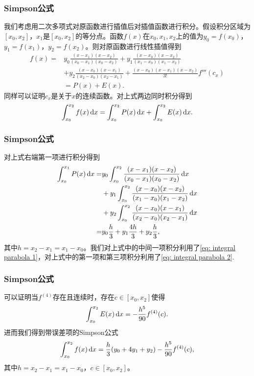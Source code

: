 \documentclass[10pt]{beamer}
\def\dx{\,{\rm d}x}
\begin{document}
\begin{frame}
\frametitle{Simpson公式}
我们考虑用二次多项式对原函数进行插值后对插值函数进行积分。假设积分区域为$[x_0, x_2]$，$x_1$是$[x_0, x_2]$的等分点。函数$f(x)$在$x_0, x_1, x_2$上的值为$y_0 = f(x_0)$，$y_1 = f(x_1)$，$y_2 = f(x_2)$。则对原函数进行线性插值得到
\begin{align*}
f(x) = &y_0 \frac{(x - x_1)(x - x_2)}{(x_0 - x_1)(x_0 - x_2)} +y_1 \frac{(x - x_0)(x - x_2)}{(x_1 - x_0)(x_1 - x_2)}  \nonumber \\
         &+ y_2 \frac{(x - x_0)(x - x_1)}{(x_2 - x_0)(x_2 - x_1)} + \frac{(x - x_0)(x - x_1)(x - x_2)}{3!}f'''(c_x)\nonumber \\
         & = P(x) + E(x). 
\end{align*}
同样可以证明$c_x$是关于$x$的连续函数。对上式两边同时积分得到
\begin{equation}
\label{eq: simpson rule original}
\int_{x_0}^{x_2} f(x) \dx = \int_{x_0}^{x_2} P(x) \dx + \int_{x_0}^{x_2} E(x) \dx.
\end{equation}
\end{frame}


\begin{frame}
\frametitle{Simpson公式}
对上式右端第一项进行积分得到
\begin{align}
\label{eq: simpson rule}
\int_{x_0}^{x_1} P(x) \dx = &y_0 \int_{x_0}^{x_2} \frac{(x - x_1)(x - x_2)}{(x_0 - x_1)(x_0 - x_2)} \dx \nonumber \\
                                            &+ y_1 \int_{x_0}^{x_2}\frac{(x - x_0)(x - x_2)}{(x_1 - x_0)(x_1 - x_2)} \dx  \nonumber \\ 
                                        & + y_2  \int_{x_0}^{x_2}  \frac{(x - x_0)(x - x_1)}{(x_2 - x_0)(x_2 - x_1)} \dx \nonumber \\
                                         = &y_0 \frac{h}{3} + y_1\frac{4h}{3}  + y_2 \frac{h}{3},
\end{align}
其中$h = x_2 - x_1 = x_1 - x_0$。我们对上式中的中间一项积分利用了\eqref{eq: integral parabola 1}，对上式中的第一项和第三项积分利用了\eqref{eq: integral parabola 2}. 
\end{frame}


\begin{frame}
\frametitle{Simpson公式}
可以证明当$f^{(4)}$存在且连续时，存在$c \in [x_0, x_2]$使得
\begin{equation}
\int_{x_0}^{x_2} E(x) \dx = -\frac{h^5}{90} f^{(4)}(c).
\end{equation}
进而我们得到带误差项的Simpson公式
\begin{equation}
\int_{x_0}^{x_2} f(x) \dx = \frac{h}{3}(y_0 + 4 y_1 + y_2) - \frac{h^5}{90} f^{(4)}(c),
\end{equation}
其中$h = x_2 - x_1 = x_1 - x_0$，$c \in [x_0, x_2]$。
\end{frame}
\end{document}
